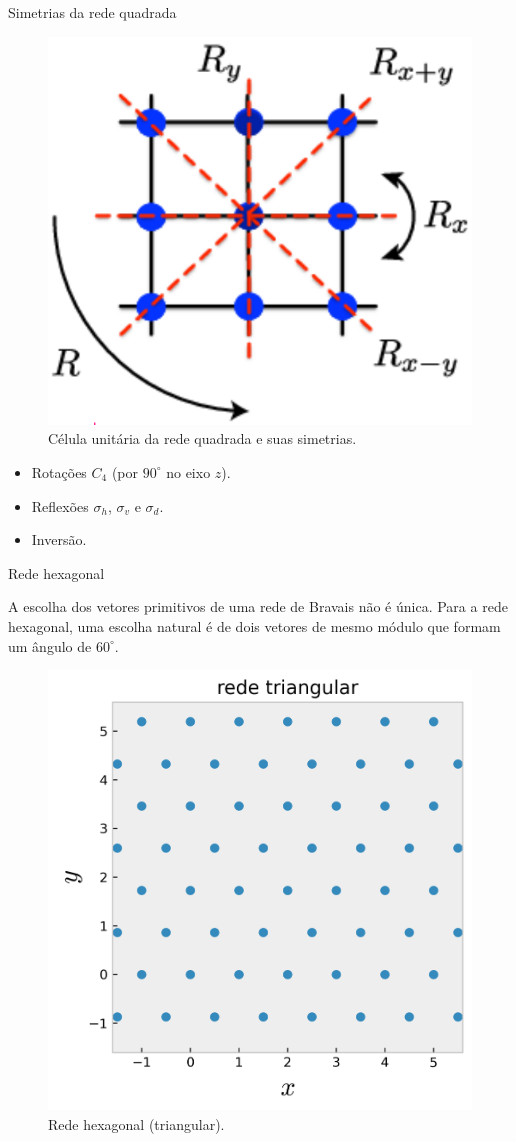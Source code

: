 \documentclass[aspectratio=169]{beamer}
\begin{document}


\begin{frame}{Simetrias da rede quadrada}

\begin{figure}[H]
\centering
\includegraphics[width=0.3\linewidth]{fig/symm_square.png}
\caption{Célula unitária da rede quadrada e suas simetrias.}
\label{fig:symm_square}
\end{figure}

\begin{itemize}
\item Rotações $C_4$ (por $90^\circ$ no eixo $z$).
\n
\item Reflexões $\sigma_h$, $\sigma_v$ e $\sigma_d$.
\n
\item Inversão.
\end{itemize}

\end{frame}




\begin{frame}{Rede hexagonal}

A escolha dos vetores primitivos de uma rede de Bravais não é única. Para a rede hexagonal, uma escolha natural é de dois vetores de mesmo módulo que formam um ângulo de $60^\circ$.

\begin{figure}[H]
\centering
\includegraphics[width=0.35\linewidth]{fig/lattice_triang.png}
\caption{Rede hexagonal (triangular).}
\label{fig:lat-triang}
\end{figure}

\end{frame}
\end{document}

